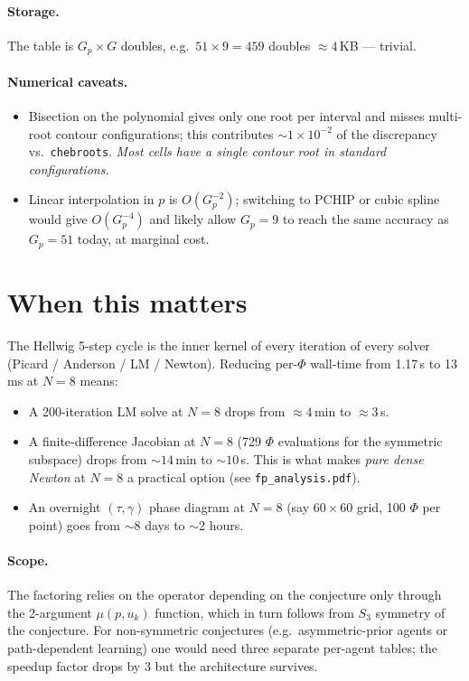 \documentclass[11pt]{article}
\begin{document}
\paragraph{Storage.} The table is $G_p\!\times\!G$ doubles, e.g.\ $51\!
\times\!9 = 459$ doubles $\approx 4$\,KB --- trivial.

\paragraph{Numerical caveats.}
\begin{itemize}
  \item Bisection on the polynomial gives only one root per interval and
        misses multi-root contour configurations; this contributes
        $\sim 1\!\times\!10^{-2}$ of the discrepancy vs.\ \texttt{chebroots}.
        \emph{Most cells have a single contour root in standard
        configurations.}
  \item Linear interpolation in $p$ is $O(G_p^{-2})$; switching to PCHIP
        or cubic spline would give $O(G_p^{-4})$ and likely allow
        $G_p{=}9$ to reach the same accuracy as $G_p{=}51$ today, at
        marginal cost.
\end{itemize}

\section{When this matters}

The Hellwig 5-step cycle is the inner kernel of every iteration of every
solver (Picard / Anderson / LM / Newton). Reducing per-$\Phi$ wall-time
from 1.17\,s to 13\,ms at $N{=}8$ means:
\begin{itemize}
  \item A 200-iteration LM solve at $N{=}8$ drops from $\approx 4$\,min
        to $\approx 3$\,s.
  \item A finite-difference Jacobian at $N{=}8$ (729 $\Phi$ evaluations
        for the symmetric subspace) drops from $\sim 14$\,min to
        $\sim 10$\,s. This is what makes \emph{pure dense Newton} at
        $N{=}8$ a practical option (see \texttt{fp\_analysis.pdf}).
  \item An overnight $(\tau,\gamma)$ phase diagram at $N{=}8$
        (say $60\times 60$ grid, 100 $\Phi$ per point) goes from
        $\sim$8 days to $\sim$2 hours.
\end{itemize}

\paragraph{Scope.} The factoring relies on the operator depending on the
conjecture only through the 2-argument $\mu(p, u_k)$ function, which in
turn follows from $S_3$ symmetry of the conjecture. For non-symmetric
conjectures (e.g.\ asymmetric-prior agents or path-dependent learning)
one would need three separate per-agent tables; the speedup factor
drops by 3 but the architecture survives.
\end{document}
